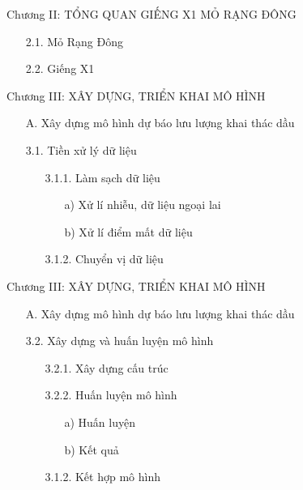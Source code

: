 \documentclass[xcolor=table, 11pt]{beamer}
\begin{document}
\begin{frame}{Chương II: TỔNG QUAN GIẾNG X1 MỎ RẠNG ĐÔNG}
    \begin{itemize}
        \item[2.1.] Mỏ Rạng Đông
        \item[2.2.] Giếng X1
    \end{itemize}
\end{frame}

\begin{frame}{Chương III: XÂY DỰNG, TRIỂN KHAI MÔ HÌNH}
    \begin{itemize}
        \item[A. ] Xây dựng mô hình dự báo lưu lượng khai thác dầu
    \end{itemize}
    \begin{itemize}
        \item[3.1.] Tiền xử lý dữ liệu
            \begin{itemize}
                \item[3.1.1.] Làm sạch dữ liệu
                    \begin{itemize}
                        \item[a)] Xử lí nhiễu, dữ liệu ngoại lai
                        \item[b)] Xử lí điểm mất dữ liệu
                    \end{itemize}
                \item[3.1.2.] Chuyển vị dữ liệu
            \end{itemize}
    \end{itemize}
\end{frame}

\begin{frame}{Chương III: XÂY DỰNG, TRIỂN KHAI MÔ HÌNH}
    \begin{itemize}
        \item[A. ] Xây dựng mô hình dự báo lưu lượng khai thác dầu
    \end{itemize}
    \begin{itemize}
        \item[3.2.] Xây dựng và huấn luyện mô hình
            \begin{itemize}
                \item[3.2.1.] Xây dựng cấu trúc
                \item[3.2.2.] Huấn luyện mô hình
                    \begin{itemize}
                        \item[a)] Huấn luyện
                        \item[b)] Kết quả
                    \end{itemize}
                \item[3.1.2.] Kết hợp mô hình
            \end{itemize}
    \end{itemize}
\end{frame}
\end{document}
